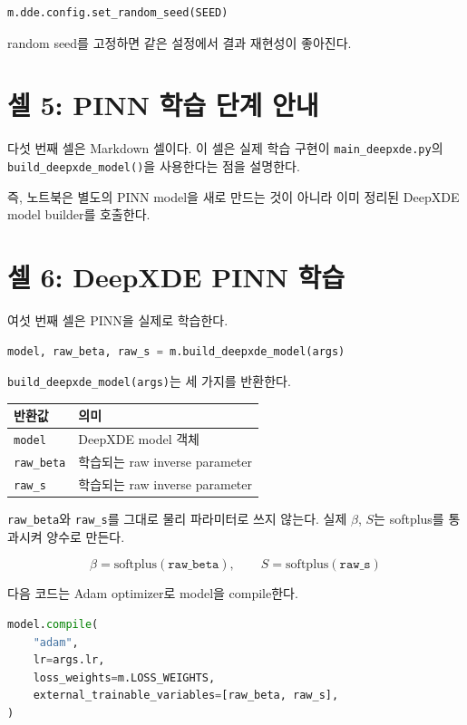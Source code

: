 \documentclass[11pt]{article}
\begin{document}
\begin{lstlisting}[language=Python]
m.dde.config.set_random_seed(SEED)
\end{lstlisting}

random seed를 고정하면 같은 설정에서 결과 재현성이 좋아진다.

\section{셀 5: PINN 학습 단계 안내}

다섯 번째 셀은 Markdown 셀이다.
이 셀은 실제 학습 구현이 \texttt{main\_deepxde.py}의 \texttt{build\_deepxde\_model()}을 사용한다는 점을 설명한다.

즉, 노트북은 별도의 PINN model을 새로 만드는 것이 아니라 이미 정리된 DeepXDE model builder를 호출한다.

\section{셀 6: DeepXDE PINN 학습}

여섯 번째 셀은 PINN을 실제로 학습한다.

\begin{lstlisting}[language=Python]
model, raw_beta, raw_s = m.build_deepxde_model(args)
\end{lstlisting}

\texttt{build\_deepxde\_model(args)}는 세 가지를 반환한다.

\begin{center}
\begin{tabular}{ll}
\toprule
반환값 & 의미 \\
\midrule
\texttt{model} & DeepXDE model 객체 \\
\texttt{raw\_beta} & 학습되는 raw inverse parameter \\
\texttt{raw\_s} & 학습되는 raw inverse parameter \\
\bottomrule
\end{tabular}
\end{center}

\texttt{raw\_beta}와 \texttt{raw\_s}를 그대로 물리 파라미터로 쓰지 않는다.
실제 \(\beta\), \(S\)는 softplus를 통과시켜 양수로 만든다.

\[
\beta = \mathrm{softplus}(\texttt{raw\_beta}),
\qquad
S = \mathrm{softplus}(\texttt{raw\_s})
\]

다음 코드는 Adam optimizer로 model을 compile한다.

\begin{lstlisting}[language=Python]
model.compile(
    "adam",
    lr=args.lr,
    loss_weights=m.LOSS_WEIGHTS,
    external_trainable_variables=[raw_beta, raw_s],
)
\end{lstlisting}
\end{document}
